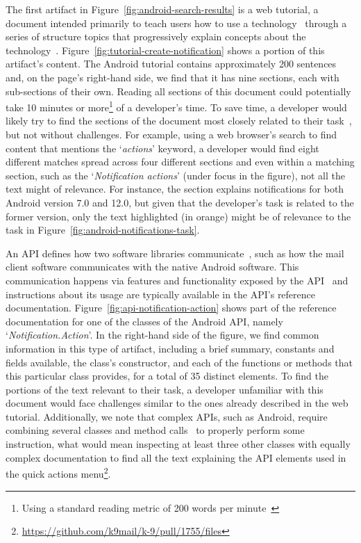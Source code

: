 The first artifact in Figure~\ref{fig:android-search-results}
is a 
 web tutorial, a document intended primarily to teach users how to use 
a technology~\cite{arya2020} through a series of structure topics 
that progressively explain concepts about the technology~\cite{Jiang2016b, Jiang2017}. 
Figure~\ref{fig:tutorial-create-notification} 
shows a portion of this artifact's content. 
The Android tutorial contains  approximately 200 sentences
and, on the page's right-hand side, we find that 
it
has nine sections, each with sub-sections of their own. 
Reading all sections of this document could potentially 
take 10 minutes or more\footnote{Using a standard reading metric of 200 words per minute~\cite{Just1980}} of a developer's time.
To save time, a developer would likely try to find the sections of the document
most closely related to their task~\cite{Li2013}, but not without challenges.
For example, using a web browser's search to find content that mentions the `\textit{actions}' keyword, 
a developer would find eight different matches spread across four different sections
and even within a matching section, 
such as the `\textit{Notification actions}'
 (under focus in the figure), 
not all the text might of relevance.
For instance,
the section explains 
notifications for both Android version 7.0 and 12.0, 
 but given that the developer's task is related to the former version,
only the text highlighted (in orange)
might be of relevance to the task in Figure~\ref{fig:android-notifications-task}.





An \acf{API} defines how  two software libraries communicate~\cite{robillard2011field},
such as how the mail client software communicates 
with the native Android software. This communication happens via features and functionality exposed by the API~\cite{Robillard2015} 
and instructions about its usage are typically available in the API's reference documentation.
Figure~\ref{fig:api-notification-action} shows part of the reference documentation for one of the classes of the Android API, namely `\textit{Notification.Action}'. 
In the right-hand side of the figure, we find common 
information in this type of artifact, including a brief summary,
constants and fields available, the class's constructor, and 
each of the functions or methods that this particular class provides,  
for a total of 35 distinct elements.
To find the portions of the text relevant to
their task,
a developer unfamiliar with this document would 
face challenges similar to the ones already  described in the web tutorial. Additionally, 
we note that complex APIs, 
such as Android, require combining several classes
and method calls~\cite{robillard2011field} to properly perform some instruction,
what would mean inspecting at least three other classes 
with equally complex documentation
to find all the text explaining the API elements used in the quick actions menu\footnote{\url{https://github.com/k9mail/k-9/pull/1755/files}}.





